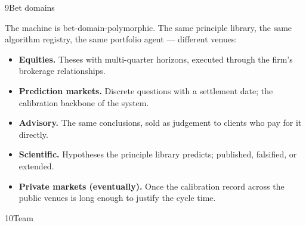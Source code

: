 \documentclass[10pt]{article}
\begin{document}
\begin{slide}{9}{Bet domains}
  \sliderule

  The machine is bet-domain-polymorphic. The same principle library,
  the same algorithm registry, the same portfolio agent --- different
  venues:

  \vspace{0.2in}

  \begin{itemize}[leftmargin=0.35in,itemsep=0.12in,topsep=0pt]
    \item \textbf{Equities.} Theses with multi-quarter horizons,
          executed through the firm's brokerage relationships.
    \item \textbf{Prediction markets.} Discrete questions with a
          settlement date; the calibration backbone of the system.
    \item \textbf{Advisory.} The same conclusions, sold as judgement
          to clients who pay for it directly.
    \item \textbf{Scientific.} Hypotheses the principle library
          predicts; published, falsified, or extended.
    \item \textbf{Private markets (eventually).} Once the calibration
          record across the public venues is long enough to justify
          the cycle time.
  \end{itemize}
\end{slide}

\begin{slide}{10}{Team}
  \sliderule

\end{slide}
\end{document}
